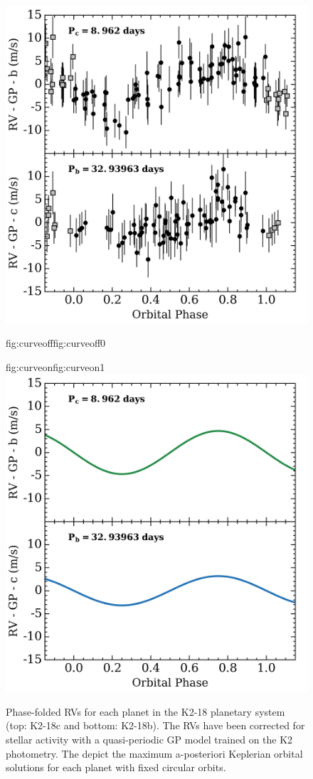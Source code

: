 \begin{figure}
  \centering
  \includegraphics[width=0.8\hsize]{figures/phasedRVs_data.png}%
   \hspace{-0.8\hsize}%
  \begin{ocg}{fig:curveoff}{fig:curveoff}{0}%
  \end{ocg}%
  \begin{ocg}{fig:curveon}{fig:curveon}{1}%
   \includegraphics[width=0.8\hsize]{figures/phasedRVs_curves.png}%
  \end{ocg}
  \hspace{-0.8\hsize}%
  \caption{Phase-folded RVs for each planet in the K2-18
  planetary system (top: K2-18c and bottom: K2-18b). The RVs have
  been corrected for stellar activity with a quasi-periodic GP
  model trained on the K2 photometry.
  The 
  depict the maximum a-posteriori Keplerian orbital solutions for each planet
  with fixed circular orbits.}
  \label{k218fig:rvs}
\end{figure}


